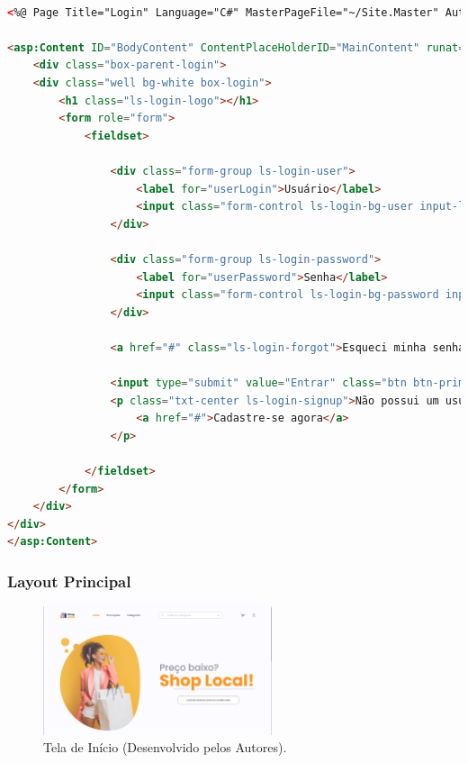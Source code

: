 \documentclass[
	12pt,				%
	openright,			%
	twoside,			%
	a4paper,			%
	english,			%
	brazil				%
	]{abntex2}
\begin{document}
\begin{lstlisting}[language=HTML, caption=Tela de Login em ASPX, label=lst:aspx]

<%@ Page Title="Login" Language="C#" MasterPageFile="~/Site.Master" AutoEventWireup="true" CodeBehind="LoginCliente.aspx.cs" Inherits="UNIPPIMVIII.LoginCliente" %>

<asp:Content ID="BodyContent" ContentPlaceHolderID="MainContent" runat="server">
    <div class="box-parent-login">
	<div class="well bg-white box-login">
		<h1 class="ls-login-logo"></h1>
		<form role="form">
			<fieldset>
 
				<div class="form-group ls-login-user">
					<label for="userLogin">Usuário</label>
					<input class="form-control ls-login-bg-user input-lg" id="userLogin" type="text" aria-label="Usuário" placeholder="Usuário">
				</div>
 
				<div class="form-group ls-login-password">
					<label for="userPassword">Senha</label>
					<input class="form-control ls-login-bg-password input-lg" id="userPassword" type="password" aria-label="Senha" placeholder="Senha">
				</div>
 
				<a href="#" class="ls-login-forgot">Esqueci minha senha</a>
 
				<input type="submit" value="Entrar" class="btn btn-primary btn-lg btn-block">
				<p class="txt-center ls-login-signup">Não possui um usuário na Locaweb?
					<a href="#">Cadastre-se agora</a>
				</p>
 
			</fieldset>
		</form>
	</div>
</div>
</asp:Content>

\end{lstlisting}

\subsubsection{Layout Principal}

\begin{figure}[htb]
    \centering
    \includegraphics[width=0.6\textwidth]{img/inicio-desktop-print.jpg}
    \caption{Tela de Início (Desenvolvido pelos Autores).}
    \label{fig:tela-de-inicio-desktop}
\end{figure}
\end{document}
